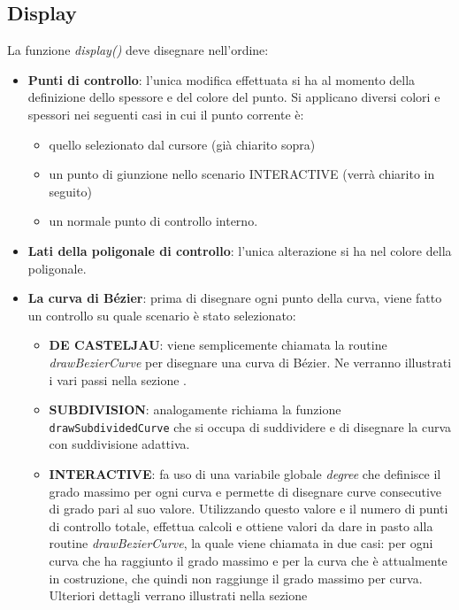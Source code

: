 \subsection{Display}
La funzione \textit{display()} deve disegnare nell'ordine:
\begin{itemize}
  \item \textbf{Punti di controllo}: l'unica modifica effettuata si ha al momento della definizione dello spessore e del colore del punto. Si applicano diversi colori e spessori nei seguenti casi in cui il punto corrente è:
 		\begin{itemize}
  			\item quello selezionato dal cursore (già chiarito sopra)
  			\item un punto di giunzione nello scenario INTERACTIVE (verrà chiarito in seguito)
  			\item un normale punto di controllo interno.
  			\end{itemize}
  \item \textbf{Lati della poligonale di controllo}: l'unica alterazione si ha nel colore della poligonale.
  \item \textbf{La curva di Bézier}: prima di disegnare ogni punto della curva, viene fatto un controllo su quale scenario è stato selezionato:
  \begin{itemize}
  			\item \textbf{DE CASTELJAU}: viene semplicemente chiamata la routine \textit{drawBezierCurve} per disegnare una curva di Bézier. Ne verranno illustrati i vari passi nella sezione .
  			\item \textbf{SUBDIVISION}: analogamente richiama la funzione \texttt{drawSubdividedCurve} che si occupa di suddividere e di disegnare la curva con suddivisione adattiva.
  			\item \textbf{INTERACTIVE}: fa uso di una variabile globale \textit{degree} che definisce il grado massimo per ogni curva e permette di disegnare curve consecutive di grado pari al suo valore. Utilizzando questo valore e il numero di punti di controllo totale, effettua calcoli e ottiene valori da dare in pasto alla routine \textit{drawBezierCurve}, la quale viene chiamata in due casi: per ogni curva che ha raggiunto il grado massimo e per la curva che è attualmente in costruzione, che quindi non raggiunge il grado massimo per curva. Ulteriori dettagli verrano illustrati nella sezione 
  			\end{itemize}
\end{itemize}


